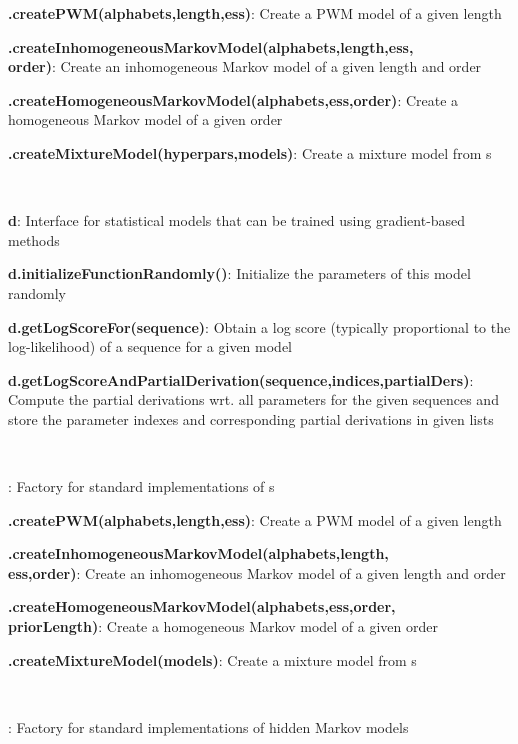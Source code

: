 \documentclass[10pt]{scrartcl}
\newcommand{\entry}[3]{{\bfseries #1#2}: #3}
\begin{document}
\begin{flushleft}
\entry{\TrainSMFactory}{.createPWM(alphabets,length,ess)}{Create a PWM model of a given length}

\entry{\TrainSMFactory}{.createInhomogeneousMarkovModel(alphabets,length,ess,\\order)}{Create an inhomogeneous Markov model of a given length and order}

\entry{\TrainSMFactory}{.createHomogeneousMarkovModel(alphabets,ess,order)}{Create a homogeneous Markov model of a given order}

\entry{\TrainSMFactory}{.createMixtureModel(hyperpars,models)}{Create a mixture model from \TrainSM s}

~

\entry{\DiffSM}{ d}{Interface for statistical models that can be trained using gradient-based methods}

\entry{d}{.initializeFunctionRandomly()}{Initialize the parameters of this model randomly}

\entry{d}{.getLogScoreFor(sequence)}{Obtain a log score (typically proportional to the log-likelihood) of a sequence for a given model}

\entry{d}{.getLogScoreAndPartialDerivation(sequence,indices,partialDers)}{Compute the partial derivations wrt. all parameters for the given sequences and store the parameter indexes and corresponding partial derivations in given lists}

~

%
\entry{\DiffSMFactory}{}{Factory for standard implementations of \DiffSM s}

\entry{\DiffSMFactory}{.createPWM(alphabets,length,ess)}{Create a PWM model of a given length}

\entry{\DiffSMFactory}{.createInhomogeneousMarkovModel(alphabets,length,\\ess,order)}{Create an inhomogeneous Markov model of a given length and order}

\entry{\DiffSMFactory}{.createHomogeneousMarkovModel(alphabets,ess,order,\\priorLength)}{Create a homogeneous Markov model of a given order}

\entry{\DiffSMFactory}{.createMixtureModel(models)}{Create a mixture model from \DiffSM s}

~

\entry{\HMMFactory}{}{Factory for standard implementations of hidden Markov models}


\end{flushleft}
\end{document}

